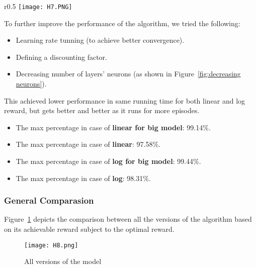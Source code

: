 \begin{wrapfigure}[10]{r}{0.5\textwidth}
    \vspace{-25pt}
    \texttt{[image: H7.PNG]}
    \caption{Effect of decreasing neurons}
    \label{fig:decreasing neurons}
\end{wrapfigure}
To further improve the performance of the algorithm, we tried the following:
\begin{itemize}
    \item Learning rate tunning (to achieve better convergence).
    \item Defining a discounting factor.
    \item Decreasing number of layers' neurons (as shown in Figure~\ref{fig:decreasing neurons}).
\end{itemize}
This achieved lower performance in same running time for both linear and log reward, but gets better and better as it runs for more episodes.
\begin{itemize}
    \item The max percentage in case of \textbf{linear for big model}: 99.14\%.
    \item The max percentage in case of \textbf{linear}: 97.58\%.
    \item The max percentage in case of \textbf{log for big model}: 99.44\%.
    \item The max percentage in case of \textbf{log}: 98.31\%.
\end{itemize}

\subsubsection{General Comparasion}
Figure~\ref{fig:all} depicts the comparison between all the versions of the algorithm based on its achievable reward subject to the optimal reward.
\begin{figure}[ht]
    \centering
    \vspace{-10pt}
    \texttt{[image: H8.png]}
    \caption{All versions of the model}
    \label{fig:all}
\end{figure}

